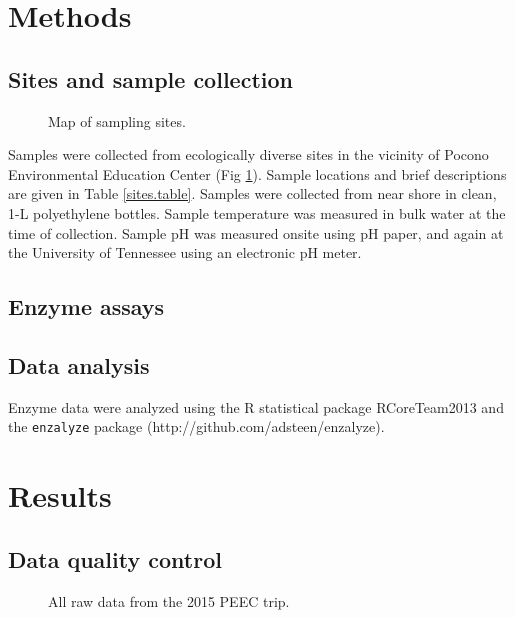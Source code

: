 \documentclass{article}
\begin{document}
    \section{Methods}
    
    \subsection{Sites and sample collection}
    \begin{figure}
    \centering
    \caption{Map of sampling sites. \label{p_map}}
    \end{figure}
    
    Samples were collected from ecologically diverse sites in the vicinity of Pocono Environmental Education Center (Fig \ref{p_map}). Sample locations and brief descriptions are given in Table \ref{sites.table}. Samples were collected from near shore in clean, 1-L polyethylene bottles. Sample temperature was measured in bulk water at the time of collection. Sample pH was measured onsite using pH paper, and again at the University of Tennessee using an electronic pH meter.
    
    
    \subsection{Enzyme assays}
    
    \subsection{Data analysis}
    Enzyme data were analyzed using the R statistical package {RCoreTeam2013} and the \texttt{enzalyze} package \linebreak (http://github.com/adsteen/enzalyze). 
    
    \section{Results}
    \subsection{Data quality control}
    \begin{figure}
    \centering
    \caption{All raw data from the 2015 PEEC trip. \label{p_raw}}
    \end{figure}
    
\end{document}
